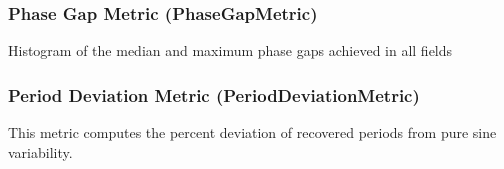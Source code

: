 \subsubsection{Phase Gap Metric (PhaseGapMetric)}
Histogram of the median and maximum phase gaps achieved in all fields

\subsubsection{Period Deviation Metric (PeriodDeviationMetric)}

This metric computes the percent deviation of recovered periods from pure sine variability.





















